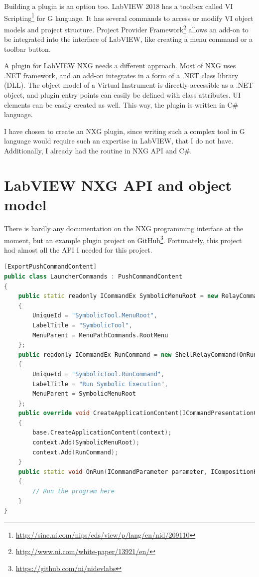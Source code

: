 Building a plugin is an option too. LabVIEW 2018 has a toolbox called VI Scripting\footnote{\url{http://sine.ni.com/nips/cds/view/p/lang/en/nid/209110}} for G language. It has several commands to access or modify VI object models and project structure. Project Provider Framework\footnote{\url{http://www.ni.com/white-paper/13921/en/}} allows an add-on to be integrated into the interface of LabVIEW, like creating a menu command or a toolbar button.

A plugin for LabVIEW NXG needs a different approach. Most of NXG uses .NET framework, and an add-on integrates in a form of a .NET class library (DLL). The object model of a Virtual Instrument is directly accessible as a .NET object, and plugin entry points can easily be defined with class attributes. UI elements can be easily created as well. This way, the plugin is written in C\# language.

I have chosen to create an NXG plugin, since writing such a complex tool in G language would require such an expertise in LabVIEW, that I do not have. Additionally, I already had the routine in NXG API and C\#.
\section{LabVIEW NXG API and object model}
There is hardly any documentation on the NXG programming interface at the moment, but an example plugin project on GitHub\footnote{\url{https://github.com/ni/nidevlabs}}. Fortunately, this project had almost all the API I needed for this project.
\lstset{escapechar=@}
\begin{lstlisting}[frame=single,escapechar=@,float=!ht,caption={NXG plugin entry point},captionpos=b,label={lst:menuapi},language=C++]
[ExportPushCommandContent]
public class LauncherCommands : PushCommandContent
{
    public static readonly ICommandEx SymbolicMenuRoot = new RelayCommandEx(RelayCommandEx.HandleNoOp)
    {
        UniqueId = "SymbolicTool.MenuRoot",
        LabelTitle = "SymbolicTool",
        MenuParent = MenuPathCommands.RootMenu
    };
    public readonly ICommandEx RunCommand = new ShellRelayCommand(OnRun)
    {
        UniqueId = "SymbolicTool.RunCommand",
        LabelTitle = "Run Symbolic Execution",
        MenuParent = SymbolicMenuRoot
    };
    public override void CreateApplicationContent(ICommandPresentationContext context)
    {
        base.CreateApplicationContent(context);
        context.Add(SymbolicMenuRoot);
        context.Add(RunCommand);
    }
    public static void OnRun(ICommandParameter parameter, ICompositionHost host, DocumentEditSite site)
    {
        // Run the program here
    }
}
\end{lstlisting}

